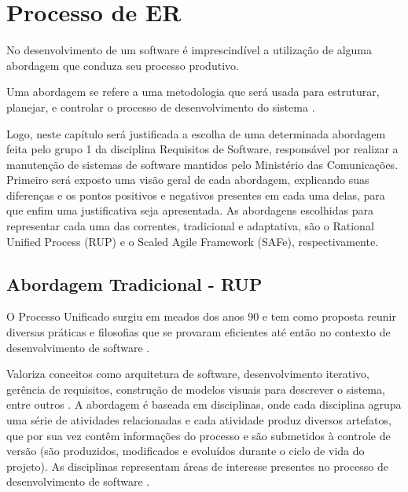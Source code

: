 \chapter[Processo de ER]{Processo de ER}
No desenvolvimento de um software é imprescindível a utilização de alguma abordagem que conduza seu processo produtivo.

Uma abordagem se refere a uma metodologia que será usada para estruturar, planejar, e controlar o processo de desenvolvimento do sistema \cite{CMS001}.

Logo, neste capítulo será justificada a escolha de uma determinada abordagem feita pelo grupo 1 da disciplina Requisitos de Software, responsável por realizar a manutenção de sistemas de software mantidos pelo Ministério das Comunicações. Primeiro será exposto uma visão geral de cada abordagem, explicando suas diferenças e os pontos positivos e negativos presentes em cada uma delas, para que enfim uma justificativa seja apresentada. As abordagens escolhidas para representar cada uma das correntes, tradicional e adaptativa, são o Rational Unified Process (RUP) e o Scaled Agile Framework (SAFe), respectivamente.

\section{Abordagem Tradicional - RUP}
O Processo Unificado surgiu em meados dos anos 90 e tem como proposta reunir diversas práticas e filosofias que se provaram eficientes até então no contexto de desenvolvimento de software \cite[p. 45]{kruchten001}.

Valoriza conceitos como arquitetura de software, desenvolvimento iterativo, gerência de requisitos, construção de modelos visuais para descrever o sistema, entre outros \cite[p. 45]{kruchten001}. A abordagem é baseada em disciplinas, onde cada disciplina agrupa uma série de atividades relacionadas e cada atividade produz diversos artefatos, que por sua vez contêm informações do processo e são submetidos à controle de versão (são produzidos, modificados e evoluídos durante o ciclo de vida do projeto). As disciplinas representam áreas de interesse presentes no processo de desenvolvimento de software \cite[p. 45]{kruchten001}.

